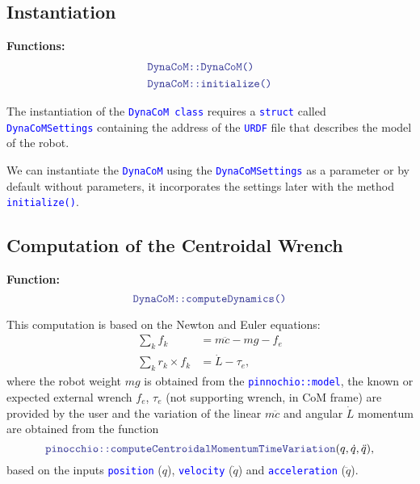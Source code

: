 \documentclass[12pt]{article}
\newcommand{\code}[2][Blue]{\textcolor{#1}{\texttt{#2}}}
\begin{document}
\subsection{Instantiation}
\hrulefill

    {\bf Functions:}
    \begin{align*}
        &\code{DynaCoM::DynaCoM()}\\
        &\code{DynaCoM::initialize()}
    \end{align*}

    The instantiation of the \code{DynaCoM class} requires a \code{struct} called \code{DynaCoMSettings} containing the address of the \code{URDF} file that describes the model of the robot.

    We can instantiate the \code{DynaCoM} using the \code{DynaCoMSettings} as a parameter or by default without parameters, it incorporates the settings later with the method \code{initialize()}.




\clearpage

\subsection{Computation of the Centroidal Wrench}

\hrulefill

{\bf Function:}
%
\begin{equation*}
    \code{DynaCoM::computeDynamics()}
\end{equation*}

This computation is based on the Newton and Euler equations:
%
\begin{align}
    \sum_k f_k &= m\ddot{c} - m g - f_e \\
    \sum_k r_k\times f_k &= \dot{L} -\tau_e,
\end{align}
%
where the robot weight $m g$ is obtained from the \code{pinnochio::model}, the known or expected external wrench $f_e$, $\tau_e$ (not supporting wrench, in CoM frame) are provided by the user and the variation of the linear $m\ddot{c}$ and angular $\dot{L}$ momentum are obtained from the function
%
\begin{equation*}
    \code{pinocchio::computeCentroidalMomentumTimeVariation}(q, \dot{q}, \ddot{q}),
\end{equation*}
%
based on the inputs \code{position} ($q$), \code{velocity} ($\dot{q}$) and \code{acceleration} ($\ddot{q}$).
\end{document}
